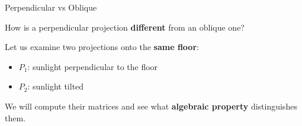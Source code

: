 \documentclass[10pt]{beamer}
\theoremstyle{definition}
\newcommand{\x}[1]{\alert{\textbf{#1}}}
\begin{document}
\begin{frame}{Perpendicular vs Oblique}

How is a perpendicular projection \x{different} from an oblique one?

\vspace{1em}

Let us examine two projections onto the \x{same floor}:
\begin{itemize}
\item $P_1$: sunlight perpendicular to the floor
\item $P_2$: sunlight tilted
\end{itemize}

\vspace{1em}

We will compute their matrices and see what \x{algebraic property} distinguishes them.

\end{frame}
\end{document}
